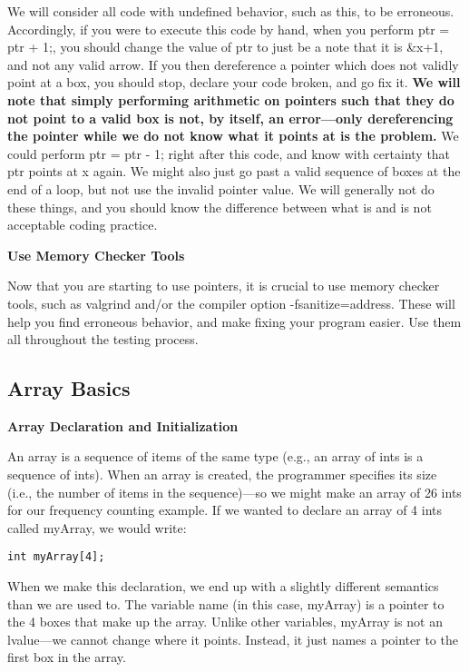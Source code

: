 \documentclass[11pt, a4paper]{article}
\begin{document}
We will consider all code with undefined behavior, such as this, to be erroneous. Accordingly, if you were to execute this code by hand, when you perform ptr = ptr + 1;, you should change the value of ptr to just be a note that it is \&x+1, and not any valid arrow. If you then dereference a pointer which does not validly point at a box, you should stop, declare your code broken, and go fix it. \textbf{We will note that simply performing arithmetic on pointers such that they do not point to a valid box is not, by itself, an error—only dereferencing the pointer while we do not know what it points at is the problem.} We could perform ptr = ptr - 1; right after this code, and know with certainty that ptr points at x again. We might also just go past a valid sequence of boxes at the end of a loop, but not use the invalid pointer value. We will generally not do these things, and you should know the difference between what is and is not acceptable coding practice.



\textbf{Use Memory Checker Tools}

Now that you are starting to use pointers, it is crucial to use memory checker tools, such as valgrind and/or the compiler option -fsanitize=address. These will help you find erroneous behavior, and make fixing your program easier. Use them all throughout the testing process.




\subsection{Array Basics}%
\label{sub:array_basics}



\textbf{Array Declaration and Initialization}


An array is a sequence of items of the same type (e.g., an array of ints is a sequence of ints). When an array is created, the programmer specifies its size (i.e., the number of items in the sequence)—so we might make an array of 26 ints for our frequency counting example. If we wanted to declare an array of 4 ints called myArray, we would write:

\texttt{int myArray[4];} 


When we make this declaration, we end up with a slightly different semantics than we are used to. The variable name (in this case, myArray) is a pointer to the 4 boxes that make up the array. Unlike other variables, myArray is not an lvalue—we cannot change where it points. Instead, it just names a pointer to the first box in the array.
\end{document}
